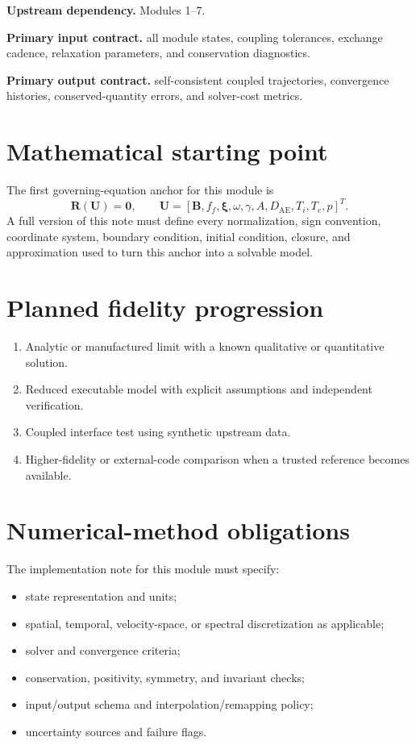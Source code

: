 \documentclass[11pt]{article}
\begin{document}
\textbf{Upstream dependency.} Modules 1--7.

\textbf{Primary input contract.} all module states, coupling tolerances, exchange cadence, relaxation parameters, and conservation diagnostics.

\textbf{Primary output contract.} self-consistent coupled trajectories, convergence histories, conserved-quantity errors, and solver-cost metrics.

\section{Mathematical starting point}
The first governing-equation anchor for this module is
\begin{equation}
\mathbf R(\mathbf U)=\mathbf 0,\qquad \mathbf U=[\mathbf B,f_f,\boldsymbol\xi,\omega,\gamma,A,D_{\mathrm{AE}},T_i,T_e,p]^T.
\end{equation}
A full version of this note must define every normalization, sign convention, coordinate system, boundary condition, initial condition, closure, and approximation used to turn this anchor into a solvable model.

\section{Planned fidelity progression}
\begin{enumerate}[leftmargin=1.6em]
\item Analytic or manufactured limit with a known qualitative or quantitative solution.
\item Reduced executable model with explicit assumptions and independent verification.
\item Coupled interface test using synthetic upstream data.
\item Higher-fidelity or external-code comparison when a trusted reference becomes available.
\end{enumerate}

\section{Numerical-method obligations}
The implementation note for this module must specify:
\begin{itemize}[leftmargin=1.6em]
\item state representation and units;
\item spatial, temporal, velocity-space, or spectral discretization as applicable;
\item solver and convergence criteria;
\item conservation, positivity, symmetry, and invariant checks;
\item input/output schema and interpolation/remapping policy;
\item uncertainty sources and failure flags.
\end{itemize}
\end{document}
